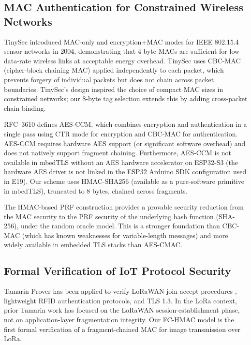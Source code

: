 \documentclass[journal]{IEEEtran}
\begin{document}
\subsection{MAC Authentication for Constrained Wireless Networks}

TinySec \cite{tinysec} introduced MAC-only and encryption+MAC modes for IEEE
802.15.4 sensor networks in 2004, demonstrating that 4-byte MACs are sufficient
for low-data-rate wireless links at acceptable energy overhead.  TinySec uses
CBC-MAC (cipher-block chaining MAC) applied independently to each packet,
which prevents forgery of individual packets but does not chain across packet
boundaries.  TinySec's design inspired the choice of compact MAC sizes in
constrained networks; our 8-byte tag selection extends this by adding
cross-packet chain binding.

RFC~3610 \cite{rfc3610} defines AES-CCM, which combines encryption and
authentication in a single pass using CTR mode for encryption and CBC-MAC for
authentication.  AES-CCM requires hardware AES support (or significant software
overhead) and does not natively support fragment chaining.  Furthermore,
AES-CCM is not available in mbedTLS without an AES hardware accelerator on
ESP32-S3 (the hardware AES driver is not linked in the ESP32 Arduino SDK
configuration used in E19).  Our scheme uses HMAC-SHA256 (available as a
pure-software primitive in mbedTLS), truncated to 8 bytes, chained across
fragments.

The HMAC-based PRF construction \cite{bellare_hmac} provides a provable
security reduction from the MAC security to the PRF security of the underlying
hash function (SHA-256), under the random oracle model.  This is a stronger
foundation than CBC-MAC (which has known weaknesses for variable-length
messages) and more widely available in embedded TLS stacks than AES-CMAC.

\subsection{Formal Verification of IoT Protocol Security}

Tamarin Prover \cite{tamarin_prover} has been applied to verify LoRaWAN
join-accept procedures \cite{tamarin_prover}, lightweight RFID authentication
protocols, and TLS 1.3.  In the LoRa context, prior Tamarin work has focused
on the LoRaWAN session-establishment phase, not on application-layer
fragmentation integrity.  Our FC-HMAC model is the first formal verification
of a fragment-chained MAC for image transmission over LoRa.
\end{document}
